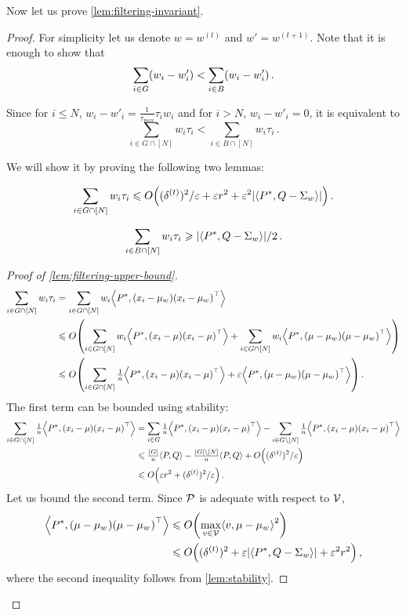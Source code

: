 Now let us prove \cref{lem:filtering-invariant}.

\begin{proof}
For simplicity let us denote $w = w^{(t)}$ and $w' = w^{(t+1)}$. Note that it is enough to show that
\[
\sum_{i\in G} \Paren{w_i - w'_i} < \sum_{i\in B} \Paren{w_i - w'_i}\,.
\]

Since for $i\le N$, $w_i - w'_i = \tfrac{1}{\tau_{\max}}\tau_i w_i$ and for $i > N$, $w_i - w'_i = 0$, it is equivalent to
\[
\sum_{i\in G\cap [N]} w_i \tau_i < \sum_{i\in B \cap [N]} w_i\tau_i\,.
\]

We will show it by proving the following two lemmas:

\begin{lemma}\label{lem:filtering-upper-bound}
\[
\sum_{i\in G\cap [N]} w_i \tau_i \le O\Paren{\paren{\delta^{(t)}}^2/\e + \e r^2  + \e^2 \Abs{\Iprod{P^*, Q-\Sigma_{w}}} }\,.
\]
\end{lemma}

\begin{lemma}\label{lem:filtering-lower-bound}
\[
\sum_{i\in B\cap [N]} w_i \tau_i \ge \Abs{\Iprod{P^*, Q-\Sigma_{w}}} / 2\,.
\]
\end{lemma}

\begin{proof}[Proof of \cref{lem:filtering-upper-bound}]
\begin{align*}
\sum_{i\in G\cap [N]} w_i \tau_i 
&= \sum_{i\in G\cap [N]} w_i \Iprod{P^*, \Paren{x_i-\mu_{w^{}}}\Paren{x_i-\mu_{w^{}}}^\top }
\\&\le O\Paren{\sum_{i\in G\cap [N]} w_i {\Iprod{P^*, \Paren{x_i-\mu}\Paren{x_i-\mu}^\top }}
+ \sum_{i\in G\cap [N]} w_i {\Iprod{P^*, \Paren{\mu-\mu_{w^{}}}\Paren{\mu-\mu_{w^{}}}^\top }} }
\\&\le O\Paren{\sum_{i\in G\cap [N]} \tfrac{1}{n} {\Iprod{P^*, \Paren{x_i-\mu}\Paren{x_i-\mu}^\top }}
+ \e {\Iprod{P^*, \Paren{\mu-\mu_{w^{}}}\Paren{\mu-\mu_{w^{}}}^\top }} }\,.
\end{align*}
The first term can be bounded using stability:
\begin{align*}
\sum_{i\in G\cap [N]} \tfrac{1}{n} {\Iprod{P^*, \Paren{x_i-\mu}\Paren{x_i-\mu}^\top }}
&= \sum_{i\in G}  \tfrac{1}{n}\Iprod{P^*, \Paren{x_i-\mu}\Paren{x_i-\mu}^\top } - \sum_{i\in G\setminus [N]}  \tfrac{1}{n}\Iprod{P^*, \Paren{x_i-\mu}\Paren{x_i-\mu}^\top}
\\&\le \tfrac{\card{G}}{n}\Iprod{P,Q} - \tfrac{\card{G}\setminus[N]}{n}\Iprod{P,Q} + O\Paren{\paren{\delta^{(t)}}^2/\e}
\\&\le O\Paren{\e r^2 + \paren{\delta^{(t)}}^2/\e}\,.
\end{align*}
Let us bound the second term. Since $\mathcal P$ is adequate with respect to $\mathcal V$,
\begin{align*}   
\Iprod{P^*, \Paren{\mu-\mu_{w^{}}}\Paren{\mu-\mu_{w^{}}}^\top }
&\le O\Paren{\max_{v\in\cV}\Iprod{v, \mu-\mu_{w^{}}}^2}
\\&\le O\Paren{\paren{\delta^{(t)}}^2 + \e \Abs{\Iprod{P^*, Q-\Sigma_{w}}} + \e^2 r^2}\,,
\end{align*}
where the second inequality follows from \cref{lem:stability}.
\end{proof}


\end{proof}
